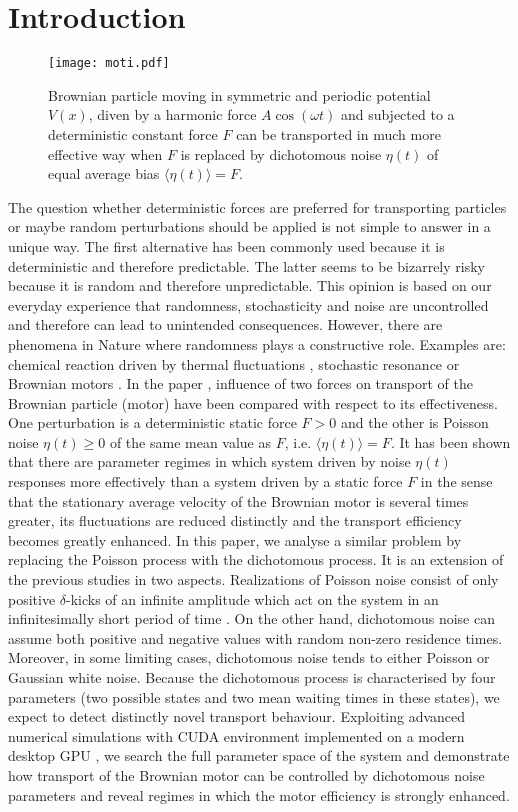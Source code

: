 \documentclass[12pt]{iopart}
\begin{document}
\section{Introduction}
\begin{figure}[b]
	\centering
	\texttt{[image: moti.pdf]}
	\caption{Brownian particle moving in 
	symmetric and periodic potential $V(x)$, diven by a harmonic force $A\cos{(\omega t)}$ 
	and subjected to a deterministic constant force $F$ can be transported in much more
	effective way when $F$ is replaced by dichotomous noise $\eta(t)$ of equal average bias
	$\langle \eta(t) \rangle = F$.}
	\label{moti}
\end{figure}
The question whether deterministic forces are preferred for transporting particles or maybe random perturbations should be applied is not simple to answer in a unique way. The first alternative has been commonly used because it is deterministic and therefore predictable. The latter seems to be bizarrely risky because it is random  and therefore unpredictable.  This opinion is based on our everyday experience  that randomness, stochasticity  and noise are  uncontrolled and therefore can lead to unintended consequences. However, there are phenomena in Nature where randomness  plays a constructive 
role. Examples are: chemical reaction driven by thermal fluctuations \cite{reactions}, stochastic resonance \cite{stochres} or Brownian motors \cite{LucTal2000,ratchets}. In the paper \cite{spiechPRE}, influence of two forces on 
transport of the Brownian particle (motor) have been compared with respect to its effectiveness. One perturbation is a deterministic static force $F>0$ and the other is Poisson noise $\eta(t) \ge 0$ of the same mean value as $F$, i.e. $\langle \eta(t) \rangle =F$. It has been shown that there are 
parameter regimes in which system driven by noise $\eta(t)$ responses more effectively than a system driven by a static force $F$ in the sense that the stationary average velocity of the Brownian motor is several times greater, its fluctuations 
are reduced distinctly and the transport efficiency becomes greatly enhanced. In this paper, we analyse a similar problem by replacing the Poisson process with the dichotomous process. It is an extension of the previous studies in two aspects. 
Realizations of Poisson noise consist of only positive $\delta$-kicks of an infinite amplitude which act on the system in an infinitesimally short period of time \cite{spiechJSTATMECH, spiechSCRIPTA}. On the other hand, dichotomous noise can assume both positive and negative values with random non-zero residence times. Moreover, in some limiting cases, dichotomous noise tends to either Poisson or Gaussian white noise. Because the dichotomous process is 
characterised by four parameters (two possible states and two mean waiting times in these states), we expect to detect distinctly novel transport behaviour. Exploiting advanced numerical simulations with CUDA environment implemented 
on a modern desktop GPU \cite{spiechCPC}, we search the full parameter space of the system and demonstrate how transport of the Brownian motor can be controlled by dichotomous noise parameters and reveal regimes in which the motor efficiency is strongly enhanced.
\end{document}
